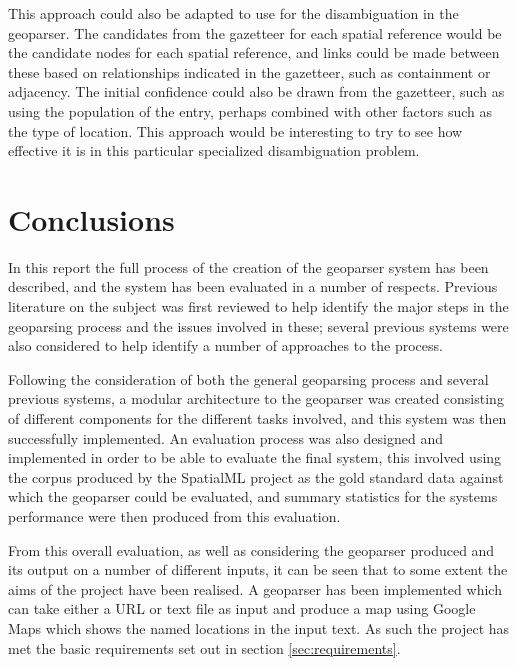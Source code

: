 \documentclass[12pt, a4paper]{report}
\begin{document}
This approach could also be adapted to use for the disambiguation in the geoparser. The candidates from the gazetteer for each spatial reference would be the candidate nodes for each spatial reference, and links could be made between these based on relationships indicated in the gazetteer, such as containment or adjacency. The initial confidence could also be drawn from the gazetteer, such as using the population of the entry, perhaps combined with other factors such as the type of location. This approach would be interesting to try to see how effective it is in this particular specialized disambiguation problem.






\chapter{Conclusions}
\label{chap:conclusion}



In this report the full process of the creation of the geoparser system has been described, and the system has been evaluated in a number of respects. Previous literature on the subject was first reviewed to help identify the major steps in the geoparsing process and the issues involved in these; several previous systems were also considered to help identify a number of approaches to the process.

Following the consideration of both the general geoparsing process and several previous systems, a modular architecture to the geoparser was created consisting of different components for the different tasks involved, and this system was then successfully implemented. An evaluation process was also designed and implemented in order to be able to evaluate the final system, this involved using the corpus produced by the SpatialML project \citep{mani2010} as the gold standard data against which the geoparser could be evaluated, and summary statistics for the systems performance were then produced from this evaluation.

From this overall evaluation, as well as considering the geoparser produced and its output on a number of different inputs, it can be seen that to some extent the aims of the project have been realised. A geoparser has been implemented which can take either a URL or text file as input and produce a map using Google Maps which shows the named locations in the input text. As such the project has met the basic requirements set out in section \ref{sec:requirements}.
\end{document}
